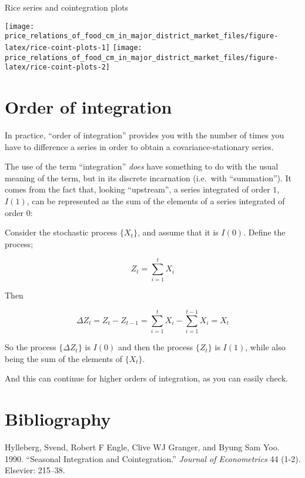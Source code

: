 \documentclass[12pt,]{article}
\begin{document}
Rice series and cointegration plots

\begin{center}\texttt{[image: price\_relations\_of\_food\_cm\_in\_major\_district\_market\_files/figure-latex/rice-coint-plots-1]} \texttt{[image: price\_relations\_of\_food\_cm\_in\_major\_district\_market\_files/figure-latex/rice-coint-plots-2]} \end{center}

\hypertarget{order-of-integration}{%
\section{Order of integration}\label{order-of-integration}}

In practice, ``order of integration'' provides you with the number of times you have to difference a series in order to obtain a covariance-stationary series.

The use of the term ``integration'' \emph{does} have something to do with the usual meaning of the term, but in its discrete incarnation (i.e.~with ``summation''). It comes from the fact that, looking ``upstream'', a series integrated of order \(1\), \(I(1)\), can be represented as the sum of the elements of a series integrated of order \(0\):

Consider the stochastic process \(\{X_t\}\), and assume that it is \(I(0)\). Define the process;

\[
Z_t = \sum_{i=1}^tX_i
\]

Then

\[
\Delta Z_t = Z_t - Z_{t-1} = \sum_{i=1}^tX_i - \sum_{i=1}^{t-1}X_i = X_t
\]

So the process \(\{\Delta Z_t\}\) is \(I(0)\) and then the process \(\{Z_t\}\) is \(I(1)\), while also being the sum of the elements of \(\{X_t\}\).

And this can continue for higher orders of integration, as you can easily check.

\hypertarget{bibliography}{%
\section*{Bibliography}\label{bibliography}}

\hypertarget{refs}{}
\leavevmode\hypertarget{ref-hylleberg1990seasonal}{}%
Hylleberg, Svend, Robert F Engle, Clive WJ Granger, and Byung Sam Yoo. 1990. ``Seasonal Integration and Cointegration.'' \emph{Journal of Econometrics} 44 (1-2). Elsevier: 215--38.
\end{document}
